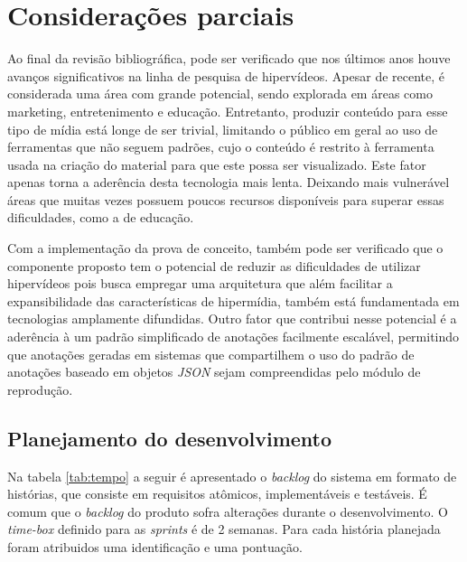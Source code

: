 \chapter[Considerações parciais]{Considerações parciais}

Ao final da revisão bibliográfica, pode ser verificado que nos últimos anos houve avanços significativos na linha de pesquisa de hipervídeos. Apesar de recente, é considerada uma área com grande potencial, sendo explorada em áreas como marketing, entretenimento e educação. Entretanto, produzir conteúdo para esse tipo de mídia está longe de ser trivial, limitando o público em geral ao uso de ferramentas que não seguem padrões, cujo o conteúdo é restrito à ferramenta usada na criação do material para que este possa ser visualizado. Este fator apenas torna a aderência desta tecnologia mais lenta. Deixando mais vulnerável áreas que muitas vezes possuem poucos recursos disponíveis para superar essas dificuldades, como a de educação.

Com a implementação da prova de conceito, também pode ser verificado que o componente proposto tem o potencial de reduzir as dificuldades de utilizar hipervídeos pois busca empregar uma arquitetura que além facilitar a expansibilidade das características de hipermídia, também está fundamentada em tecnologias amplamente difundidas. Outro fator que contribui nesse potencial é a aderência à um padrão simplificado de anotações facilmente escalável, permitindo que anotações geradas em sistemas que compartilhem o uso do padrão de anotações baseado em objetos \textit{JSON} sejam compreendidas pelo módulo de reprodução.

\section{Planejamento do desenvolvimento}

Na tabela \ref{tab:tempo} a seguir é apresentado o \textit{backlog} do sistema em formato de histórias, que consiste em requisitos atômicos, implementáveis e testáveis. É comum que o \textit{backlog} do produto sofra alterações durante o desenvolvimento. O \textit{time-box} definido para as \textit{sprints} é de 2 semanas. Para cada história planejada foram atribuidos uma identificação e uma pontuação.

